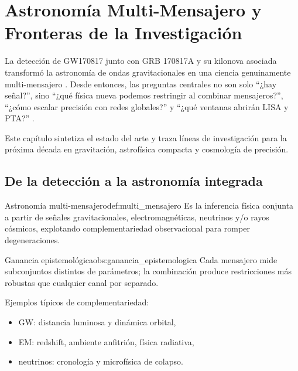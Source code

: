 
\chapter{Astronomía Multi-Mensajero y Fronteras de la Investigación}
\label{cap:multimensajero_fronteras}

La detección de GW170817 junto con GRB 170817A y su kilonova asociada transformó la astronomía de ondas gravitacionales en una ciencia genuinamente multi-mensajero \cite{Abbott2017BNS, Abbott2017multimessenger, Abbott2017H0}. Desde entonces, las preguntas centrales no son solo ``¿hay señal?'', sino ``¿qué física nueva podemos restringir al combinar mensajeros?'', ``¿cómo escalar precisión con redes globales?'' y ``¿qué ventanas abrirán LISA y PTA?'' \cite{LISA2017, NANOGrav2023, Maggiore2018}.

Este capítulo sintetiza el estado del arte y traza líneas de investigación para la próxima década en gravitación, astrofísica compacta y cosmología de precisión.

\section{De la detección a la astronomía integrada}
\label{sec:deteccion_astronomia_integrada}

\begin{definicion}{Astronomía multi-mensajero}{def:multi_mensajero}
Es la inferencia física conjunta a partir de señales gravitacionales, electromagnéticas, neutrinos y/o rayos cósmicos, explotando complementariedad observacional para romper degeneraciones.
\end{definicion}

\begin{observacion}{Ganancia epistemológica}{obs:ganancia_epistemologica}
Cada mensajero mide subconjuntos distintos de parámetros; la combinación produce restricciones más robustas que cualquier canal por separado.
\end{observacion}

Ejemplos típicos de complementariedad:
\begin{itemize}[leftmargin=2em]
  \item GW: distancia luminosa y dinámica orbital,
  \item EM: redshift, ambiente anfitrión, física radiativa,
  \item neutrinos: cronología y microfísica de colapso.
\end{itemize}

